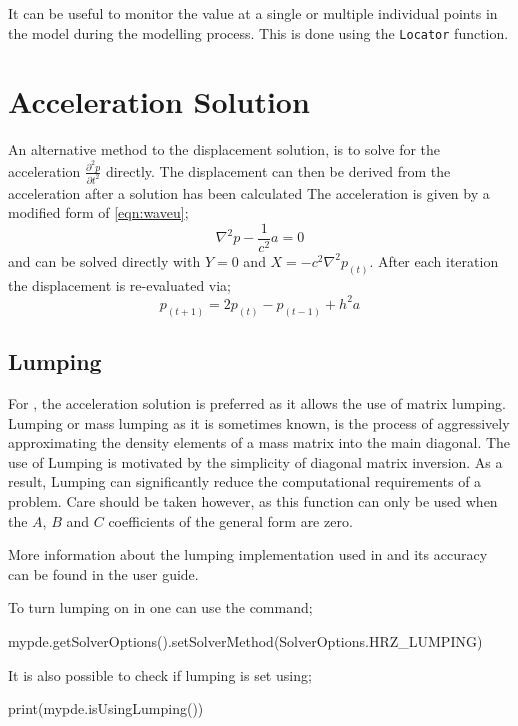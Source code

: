 It can be useful to monitor the value at a single or multiple individual points
in the model during the modelling process. This is done using 
the \verb!Locator! function.


\section{Acceleration Solution}

An alternative method to the displacement solution, is to solve for the
acceleration $\frac{\partial ^2 p}{\partial t^2}$ directly. The displacement can
then be derived from the acceleration after a solution has been calculated
The acceleration is given by a modified form of \autoref{eqn:waveu};
\begin{equation}
  \nabla ^2 p - \frac{1}{c^2} a = 0
\label{eqn:wavea}
\end{equation}
and can be solved directly with $Y=0$ and $X=-c^2 \nabla ^2 p_{(t)}$.
After each iteration the displacement is re-evaluated via;
\begin{equation}
 p_{(t+1)}=2p_{(t)} - p_{(t-1)} + h^2a
\end{equation}

\subsection{Lumping}
For \esc, the acceleration solution is preferred as it allows the use of matrix
lumping. Lumping or mass lumping as it is sometimes known, is the process of
aggressively approximating the density elements of a mass matrix into the main
diagonal. The use of Lumping is motivated by the simplicity of diagonal matrix
 inversion. As a result, Lumping can significantly reduce the computational
requirements of a problem. Care should be taken however, as this
function can only be used when the $A$, $B$ and $C$ coefficients of the
general form are zero. 

More information about the lumping implementation used in \esc and its accuracy
can be found in the user guide.

To turn lumping on in \esc one can use the command;
\begin{python}
 mypde.getSolverOptions().setSolverMethod(SolverOptions.HRZ_LUMPING)
\end{python}
It is also possible to check if lumping is set using;
\begin{python}
  print(mypde.isUsingLumping())
\end{python}


